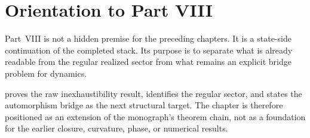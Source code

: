 \chapter*{Orientation to Part VIII}
\label{part:intro-observable}
\begin{chapterorientation}
\end{chapterorientation}

Part~VIII is not a hidden premise for the preceding chapters.  It is a
state-side continuation of the completed stack.  Its purpose is to
separate what is already readable from the regular realized sector from
what remains an explicit bridge problem for dynamics.

 proves the raw inexhaustibility result,
identifies the regular sector, and states the automorphism bridge as the
next structural target.  The chapter is therefore positioned as an
extension of the monograph's theorem chain, not as a foundation for the
earlier closure, curvature, phase, or numerical results.
